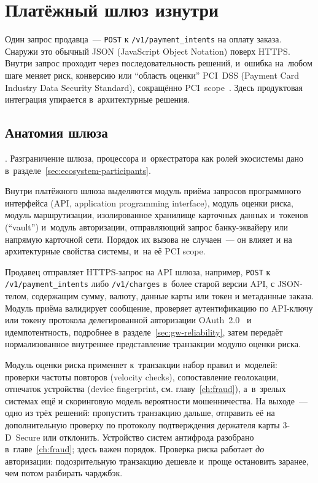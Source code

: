 
\chapter{Платёжный шлюз изнутри}\label{ch:gateway}

Один запрос продавца~--- \texttt{POST} к \texttt{/v1/payment\_intents}
на оплату заказа. Снаружи это обычный JSON (JavaScript Object Notation)
поверх HTTPS. Внутри запрос проходит через последовательность решений,
и~ошибка на~любом шаге меняет риск, конверсию или
\enquote{область оценки} PCI~DSS (Payment Card Industry Data Security
Standard), сокращённо PCI~scope~\cite{pci-dss-4}. Здесь продуктовая
интеграция упирается в~архитектурные решения.

\section{Анатомия шлюза}\label{sec:gw-anatomy}

. Разграничение
шлюза, процессора и~оркестратора как ролей экосистемы дано
в~разделе~\ref{sec:ecosystem-participants}.

Внутри платёжного шлюза выделяются модуль приёма запросов программного
интерфейса (API, application programming interface), модуль оценки риска,
модуль маршрутизации, изолированное хранилище карточных данных и~токенов
(\enquote{vault}) и~модуль авторизации, отправляющий запрос банку-эквайеру
или напрямую карточной сети. Порядок их вызова не случаен~---
он влияет и на архитектурные свойства системы, и~на её PCI scope.

Продавец отправляет HTTPS-запрос на API шлюза, например,
\texttt{POST} к \texttt{/v1/payment\_intents} либо
\texttt{/v1/charges} в~более старой версии API, с JSON-телом,
содержащим сумму, валюту, данные карты или токен и метаданные
заказа. Модуль приёма валидирует сообщение, проверяет
аутентификацию по API-ключу или токену протокола делегированной
авторизации OAuth~2.0~\cite{rfc-6749} и идемпотентность,
подробнее в~разделе~\ref{sec:gw-reliability}, затем передаёт
нормализованное внутреннее представление транзакции модулю оценки риска.

Модуль оценки риска применяет к~транзакции набор правил и~моделей:
проверки частоты повторов (velocity checks), сопоставление
геолокации, отпечаток устройства (device fingerprint, см.
главу~\ref{ch:fraud}), а~в~зрелых системах ещё и
скоринговую модель вероятности мошенничества. На выходе~---
одно из трёх решений: пропустить транзакцию дальше, отправить
её на дополнительную проверку по протоколу подтверждения
держателя карты 3-D~Secure или отклонить.
Устройство систем антифрода разобрано в~главе~\ref{ch:fraud};
здесь важен порядок. Проверка риска работает \emph{до} авторизации:
подозрительную транзакцию дешевле и~проще остановить заранее,
чем потом разбирать чарджбэк.

